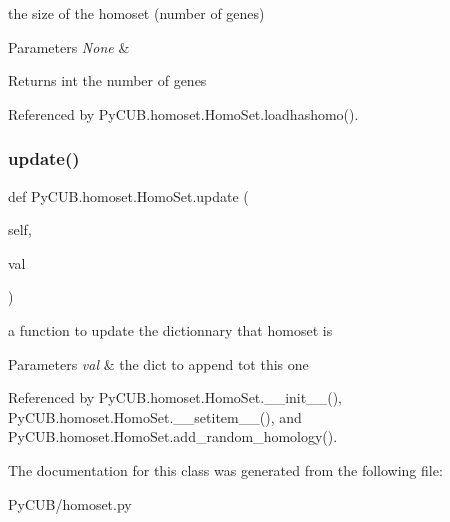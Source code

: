 the size of the homoset (number of genes) 


\begin{DoxyParams}{Parameters}
{\em None} & \\
\hline
\end{DoxyParams}
\begin{DoxyReturn}{Returns}
int the number of genes 
\end{DoxyReturn}


Referenced by Py\+C\+U\+B.\+homoset.\+Homo\+Set.\+loadhashomo().

\mbox{\label{class_py_c_u_b_1_1homoset_1_1_homo_set_a8cf76800f047841bf63d507fb1b54048}} 
\subsubsection{\texorpdfstring{update()}{update()}}
{\footnotesize\ttfamily def Py\+C\+U\+B.\+homoset.\+Homo\+Set.\+update (\begin{DoxyParamCaption}\item[{}]{self,  }\item[{}]{val }\end{DoxyParamCaption})}



a function to update the dictionnary that homoset is 


\begin{DoxyParams}{Parameters}
{\em val} & the dict to append tot this one \\
\hline
\end{DoxyParams}


Referenced by Py\+C\+U\+B.\+homoset.\+Homo\+Set.\+\_\+\+\_\+init\+\_\+\+\_\+(), Py\+C\+U\+B.\+homoset.\+Homo\+Set.\+\_\+\+\_\+setitem\+\_\+\+\_\+(), and Py\+C\+U\+B.\+homoset.\+Homo\+Set.\+add\+\_\+random\+\_\+homology().



The documentation for this class was generated from the following file\+:\begin{DoxyCompactItemize}
\item 
Py\+C\+U\+B/homoset.\+py\end{DoxyCompactItemize}
